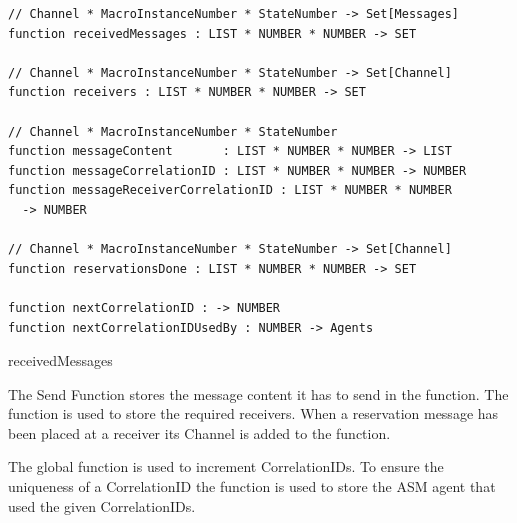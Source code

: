 \begin{listing}[htbp]
\begin{verbatim}
// Channel * MacroInstanceNumber * StateNumber -> Set[Messages]
function receivedMessages : LIST * NUMBER * NUMBER -> SET

// Channel * MacroInstanceNumber * StateNumber -> Set[Channel]
function receivers : LIST * NUMBER * NUMBER -> SET

// Channel * MacroInstanceNumber * StateNumber
function messageContent       : LIST * NUMBER * NUMBER -> LIST
function messageCorrelationID : LIST * NUMBER * NUMBER -> NUMBER
function messageReceiverCorrelationID : LIST * NUMBER * NUMBER
  -> NUMBER

// Channel * MacroInstanceNumber * StateNumber -> Set[Channel]
function reservationsDone : LIST * NUMBER * NUMBER -> SET

function nextCorrelationID : -> NUMBER
function nextCorrelationIDUsedBy : NUMBER -> Agents
\end{verbatim}
\caption{receivedMessages}
\label{lst:shortasm:receivedMessages}
\end{listing}


The Send Function stores the message content it has to send in the
 function. The  function is
used to store the required receivers. When a reservation message has been
placed at a receiver its Channel is added to the 
function.

The global function  is used to increment
CorrelationIDs. To ensure the uniqueness of a CorrelationID the
 function is used to store the ASM agent
that used the given CorrelationIDs.



